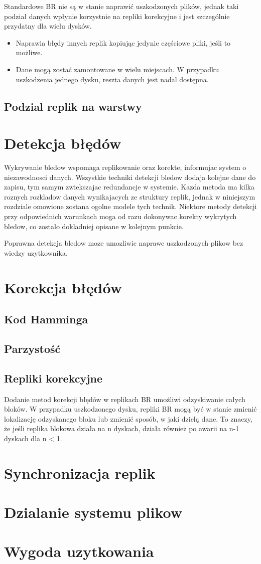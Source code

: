 Standardowe BR nie są w stanie naprawić uszkodzonych plików, jednak taki podział danych wpłynie korzystnie na repliki korekcyjne i jest szczególnie przydatny dla wielu dysków.
\begin{itemize}
    \item Naprawia błędy innych replik kopiując jedynie częściowe pliki, jeśli to możliwe.
    \item Dane mogą zostać zamontowane w wielu miejscach. W przypadku uszkodzenia jednego dysku, reszta danych jest nadal dostępna.
\end{itemize}

\subsection{Podzial replik na warstwy}

\section {Detekcja błędów}
    Wykrywanie bledow wspomaga replikowanie oraz korekte, informujac system o niezawodnosci danych. Wszystkie techniki detekcji bledow dodaja kolejne dane do zapisu, tym samym zwiekszajac redundancje w systemie. Kazda metoda ma kilka roznych rozkladow danych wynikajacych ze struktury replik, jednak w niniejszym rozdziale omowione zostana ogolne modele tych technik. Niektore metody detekcji przy odpowiednich warunkach moga od razu dokonywac korekty wykrytych bledow, co zostalo dokladniej opisane w kolejnym punkcie.

    Poprawna detekcja bledow moze umozliwic naprawe uszkodzonych plikow bez wiedzy uzytkownika.
\section {Korekcja błędów}

\subsection{Kod Hamminga}
\subsection{Parzystość}
\subsection{Repliki korekcyjne}

Dodanie metod korekcji błędów w replikach BR umożliwi odzyskiwanie całych bloków. W przypadku uszkodzonego dysku, repliki BR mogą być w stanie zmienić lokalizację odzyskanego bloku lub zmienić sposób, w jaki dzielą dane. To znaczy, że jeśli replika blokowa działa na n dyskach, działa również po awarii na n-1 dyskach dla n < 1.

\section {Synchronizacja replik}

\section {Dzialanie systemu plikow}

\section {Wygoda uzytkowania}
